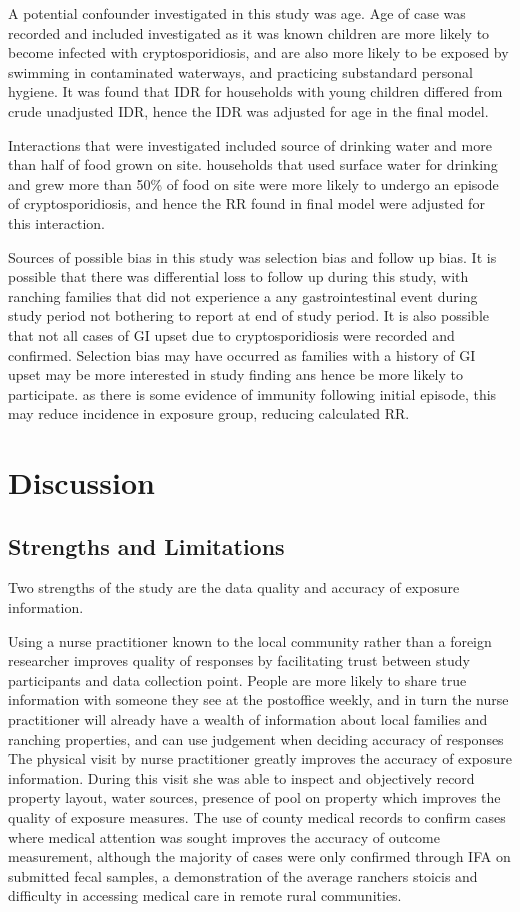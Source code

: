 \documentclass[12pt]{article}
\begin{document}
		A potential confounder investigated in this study was age.
		Age of case was recorded and included investigated as it was known children are more likely to become infected with cryptosporidiosis, and are also more likely to be exposed by swimming in contaminated waterways, and practicing substandard personal hygiene.
		It was found that IDR for households with young children differed from crude unadjusted IDR, hence the IDR was adjusted for age in the final model.


		Interactions that were investigated included source of drinking water and more than half of food grown on site.
		households that used surface water for drinking and grew more than 50\% of food on site were more likely to undergo an episode of cryptosporidiosis, and hence the RR found in final model were adjusted for this interaction.


		Sources of possible bias in this study was selection bias and follow up bias.
		It is possible that there was differential loss to follow up during this study, with ranching families that did not experience a any gastrointestinal event during study period not bothering to report at end of study period.
		It is also possible that not all cases of GI upset due to cryptosporidiosis were recorded and confirmed. 
		Selection bias may have occurred as families with a history of GI upset may be more interested in study finding ans hence be more likely to participate. as there is some evidence of immunity following initial episode, this may reduce incidence in exposure group, reducing calculated RR.


	\section{Discussion} 


	\subsection{Strengths and Limitations}
		Two strengths of the study are the data quality and accuracy of exposure information.

		Using a nurse practitioner known to the local community rather than a foreign researcher improves quality of responses by facilitating trust between study participants and data collection point. 
		People are more likely to share true information with someone they see at the postoffice weekly, and in turn the nurse practitioner will already have a wealth of information about local families and ranching properties, and can use judgement when deciding accuracy of responses
		The physical visit by nurse practitioner greatly improves the accuracy of exposure information. 
		During this visit she was able to inspect and objectively record property layout, water sources, presence of pool on property which improves the quality of exposure measures.
		The use of county medical records to confirm cases where medical attention was sought improves the accuracy of outcome measurement, although the majority of cases were only confirmed through IFA on submitted fecal samples, a demonstration of the average ranchers stoicis and difficulty in accessing medical care in remote rural communities. 
\end{document}
